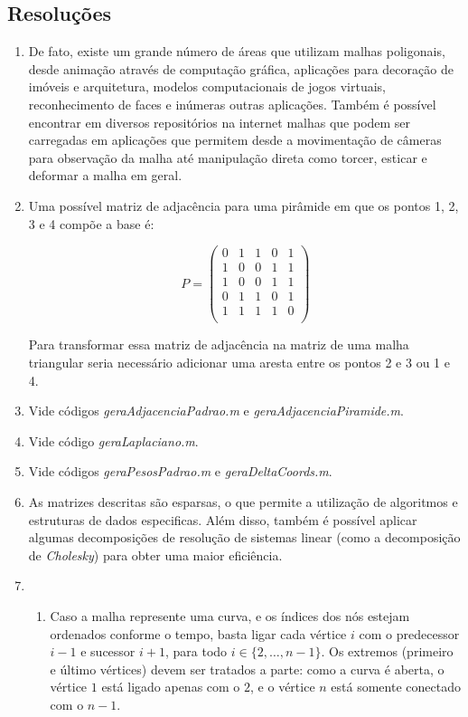 \subsection{Resoluções}
\begin{enumerate}
    \item De fato, existe um grande número de áreas que utilizam malhas poligonais, desde animação através de computação gráfica, aplicações para decoração de imóveis e arquitetura, modelos computacionais de jogos virtuais, reconhecimento de faces e inúmeras outras aplicações. Também é possível encontrar em diversos repositórios na internet malhas que podem ser carregadas em aplicações que permitem desde a movimentação de câmeras para observação da malha até manipulação direta como torcer, esticar e deformar a malha em geral.
    
    \item Uma possível matriz de adjacência para uma pirâmide em que os pontos 1, 2, 3 e 4 compõe a base é:

$$P = \begin{pmatrix}
0 & 1 & 1 & 0 & 1\\
1 & 0 & 0 & 1 & 1\\
1 & 0 & 0 & 1 & 1\\
0 & 1 & 1 & 0 & 1\\
1 & 1 & 1 & 1 & 0\\
\end{pmatrix}$$

Para transformar essa matriz de adjacência na matriz de uma malha triangular seria necessário adicionar uma aresta entre os pontos 2 e 3 ou 1 e 4.

    \item Vide códigos \textit{geraAdjacenciaPadrao.m} e \textit{geraAdjacenciaPiramide.m}.

    \item Vide código \textit{geraLaplaciano.m}.
    
    \item Vide códigos \textit{geraPesosPadrao.m} e \textit{geraDeltaCoords.m}.

    \item As matrizes descritas são esparsas, o que permite a utilização de algoritmos e estruturas de dados especificas. Além disso, também é possível aplicar algumas decomposições de resolução de sistemas linear (como a decomposição de \textit{Cholesky}) para obter uma maior eficiência.
    
    \item 
    \begin{enumerate}
        \item Caso a malha represente uma curva, e os índices dos nós estejam ordenados conforme o tempo, basta ligar cada vértice $i$ com o predecessor $i-1$ e sucessor $i+1$, para todo $i \in \{2, \dots, n-1\}$. Os extremos (primeiro e último vértices) devem ser tratados a parte: como a curva é aberta, o vértice $1$ está ligado apenas com o $2$, e o vértice $n$ está somente conectado com o $n-1$.
        

\end{enumerate}
\end{enumerate}
